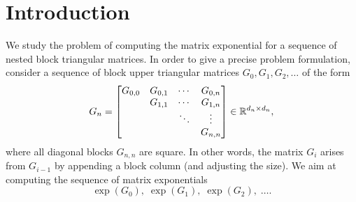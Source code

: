 \section{Introduction}


We study the problem of computing the matrix exponential for a sequence of nested block
triangular matrices. In order to give a precise problem formulation, consider a sequence of
block upper triangular matrices $G_0, G_1, G_2, \dotsc$ of the form
\begin{equation}
    \label{eq:G_n}
    G_n =
    \begin{bmatrix}
        G_{0,0} & G_{0,1}  & \cdots & G_{0,n} \\
                & G_{1,1}  & \cdots & G_{1,n} \\
                &          & \ddots & \vdots  \\
                &          &        & G_{n,n} \\
    \end{bmatrix}
    \in {\mathbb R}^{d_n \times d_n},
\end{equation}
where all diagonal blocks $G_{n,n}$ are square.  In other words, the
matrix $G_i$ arises from $G_{i-1}$ by appending a block column
(and adjusting the size).  We aim at computing the sequence of
matrix exponentials
\begin{equation}
    \label{eq:exp_sequence}
    \exp(G_0),\; \exp(G_1),\; \exp(G_2),\; \dotsc .
\end{equation}


